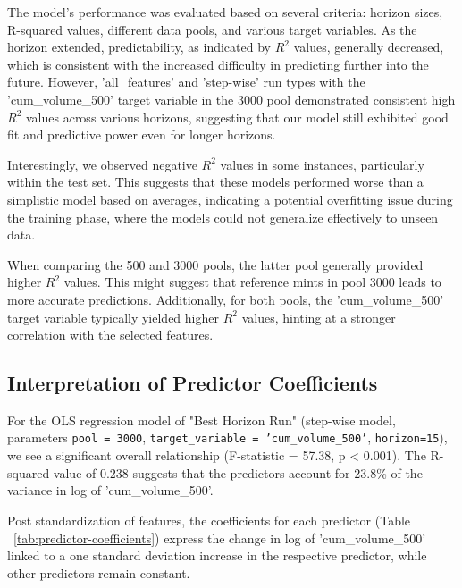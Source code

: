 \documentclass{article}
\begin{document}
The model's performance was evaluated based on several criteria: horizon sizes, R-squared values, different data pools, and various target variables. As the horizon extended, predictability, as indicated by \( R^2 \) values, generally decreased, which is consistent with the increased difficulty in predicting further into the future. However, 'all\_features' and 'step-wise' run types with the 'cum\_volume\_500' target variable in the 3000 pool demonstrated consistent high \( R^2 \) values across various horizons, suggesting that our model still exhibited good fit and predictive power even for longer horizons.

Interestingly, we observed negative \( R^2 \) values in some instances, particularly within the test set. This suggests that these models performed worse than a simplistic model based on averages, indicating a potential overfitting issue during the training phase, where the models could not generalize effectively to unseen data.

When comparing the 500 and 3000 pools, the latter pool generally provided higher \( R^2 \) values. This might suggest that reference mints in pool 3000 leads to more accurate predictions. Additionally, for both pools, the 'cum\_volume\_500' target variable typically yielded higher \( R^2 \) values, hinting at a stronger correlation with the selected features.

\subsection{Interpretation of Predictor Coefficients}
For the OLS regression model of "Best Horizon Run" (step-wise model, parameters \texttt{pool = 3000}, \texttt{target\_variable = 'cum\_volume\_500'}, \texttt{horizon=15}), we see a significant overall relationship (F-statistic = 57.38, p \textless{} 0.001). The R-squared value of 0.238 suggests that the predictors account for 23.8\% of the variance in log of 'cum\_volume\_500'.

Post standardization of features, the coefficients for each predictor (Table ~\ref{tab:predictor-coefficients}) express the change in log of 'cum\_volume\_500' linked to a one standard deviation increase in the respective predictor, while other predictors remain constant.
\end{document}
